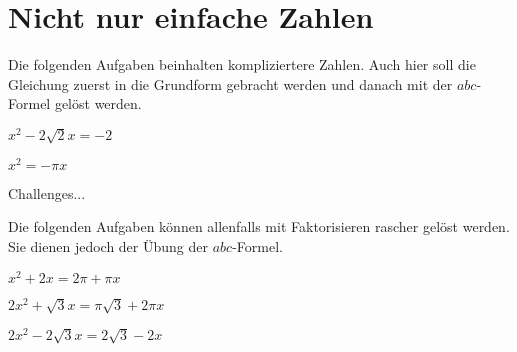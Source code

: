 \section{Nicht nur einfache Zahlen}
Die folgenden Aufgaben beinhalten kompliziertere Zahlen. Auch hier
soll die Gleichung zuerst in die Grundform gebracht werden und danach
mit der $abc$-Formel gelöst werden.

\begin{bbwAufgabenBlock}
\item $ x^2 - 2\sqrt{2}x = -2$

\item $ x^2 = -\pi x $

Challenges...

Die folgenden Aufgaben können allenfalls mit Faktorisieren rascher
gelöst werden. Sie dienen jedoch der Übung der $abc$-Formel.

\item $ x^2 + 2x = 2\pi + \pi x$

\item $ 2x^2 +\sqrt{3} x= \pi \sqrt{3} + 2\pi x$

\item $ 2x^2 -2\sqrt{3} x = 2\sqrt{3}- 2x $

\end{bbwAufgabenBlock}
\newpage
